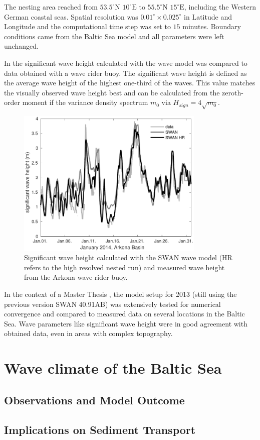 The nesting area reached from $53.5^\circ \text{N } 10^\circ \text{E}$ to 
$55.5^\circ \text{N } 15^\circ \text{E}$, including the Western German coastal 
seas. Spatial resolution was $0.01^\circ \times 0.025^\circ $ in Latitude and 
Longitude and the computational time step was set to $15$ minutes. Boundary 
conditions came from the Baltic Sea model and all parameters were left 
unchanged.

In  the significant wave height calculated with the wave model was 
compared to data obtained with a wave rider buoy. The significant wave height 
is defined as the average wave height of the highest one-third of the waves. 
This value matches the visually observed wave height best and can be calculated 
from the zeroth-order moment if the variance density spectrum $m_0$ via 
$H_{sign} = 4 \sqrt{m_0}$.
\begin{figure}[ht]
 \includegraphics[width=9cm]{bilder/januar.pdf}
 \caption{Significant wave height calculated with the SWAN wave model (HR 
refers to the high resolved nested run) and measured wave height from the 
Arkona wave rider buoy.\label{verify}}
\end{figure}

In the context of a Master Thesis \citep[][]{masterarbeitronja}, the model 
setup for 2013 (still using the previous version SWAN 40.91AB) was 
extensively tested for numerical convergence and compared to measured data on 
several locations in the Baltic Sea. Wave parameters like significant wave 
height were in good agreement with obtained data, even in areas with complex 
topography.

\section{Wave climate of the Baltic Sea}	

\subsection{Observations and Model Outcome}

\subsection{Implications on Sediment Transport}
